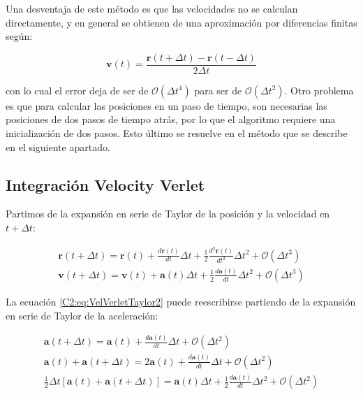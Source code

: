 Una desventaja de este método es que las velocidades no se calculan directamente, y en general se obtienen de una aproximación por diferencias finitas según:

\begin{equation}
\mathbf{v}(t) = \frac{\mathbf{r}(t+\Delta{}t) - \mathbf{r}(t-\Delta{}t)}{2\Delta{}t}
\end{equation}

con lo cual el error deja de ser de $\mathcal{O}(\Delta{}t^{4})$ para ser de $\mathcal{O}(\Delta{}t^{2})$. Otro problema es que para calcular las posiciones en un paso de tiempo, son necesarias las posiciones de dos pasos de tiempo atrás, por lo que el algoritmo requiere una inicialización de dos pasos. Esto último se resuelve en el método que se describe en el siguiente apartado.

\subsection{Integración Velocity Verlet}
\label{S2_4_2}

Partimos de la expansión en serie de Taylor de la posición y la velocidad en $t+\Delta{}t$:

\begin{eqnarray}
\mathbf{r}(t+\Delta{}t) = \mathbf{r}(t)+\frac{d\mathbf{r}(t)}{dt} \Delta{}t + \frac{1}{2} \frac{d^{2}\mathbf{r}(t)}{dt^{2}} \Delta{}t^{2} + \mathcal{O}(\Delta{}t^{3})
\label{C2:eq:VelVerletTaylor1} \\
\mathbf{v}(t+\Delta{}t) = \mathbf{v}(t)+\mathbf{a}(t)\Delta{}t + \frac{1}{2}\frac{d\mathbf{a}(t)}{dt} \Delta{}t^{2} + \mathcal{O}(\Delta{}t^{3})
\label{C2:eq:VelVerletTaylor2}
\end{eqnarray}

La ecuación \ref{C2:eq:VelVerletTaylor2} puede reescribirse partiendo de la expansión en serie de Taylor de la aceleración:

\begin{eqnarray}
\mathbf{a}(t+\Delta{}t) = \mathbf{a}(t)+\frac{d\mathbf{a}(t)}{dt} \Delta{}t + \mathcal{O}(\Delta{}t^{2})
\label{C2:eq:tayloracc1} \\
\mathbf{a}(t)+\mathbf{a}(t+\Delta{}t) = 2\mathbf{a}(t)+\frac{d\mathbf{a}(t)}{dt} \Delta{}t + \mathcal{O}(\Delta{}t^{2})
\label{C2:eq:tayloracc2} \\
\frac{1}{2}\Delta{}t\left[\mathbf{a}(t)+\mathbf{a}(t+\Delta{}t)\right] = \mathbf{a}(t)\Delta{}t+\frac{1}{2}\frac{d\mathbf{a}(t)}{dt} \Delta{}t^{2} + \mathcal{O}(\Delta{}t^{2})
\label{C2:eq:tayloracc3}
\end{eqnarray}


